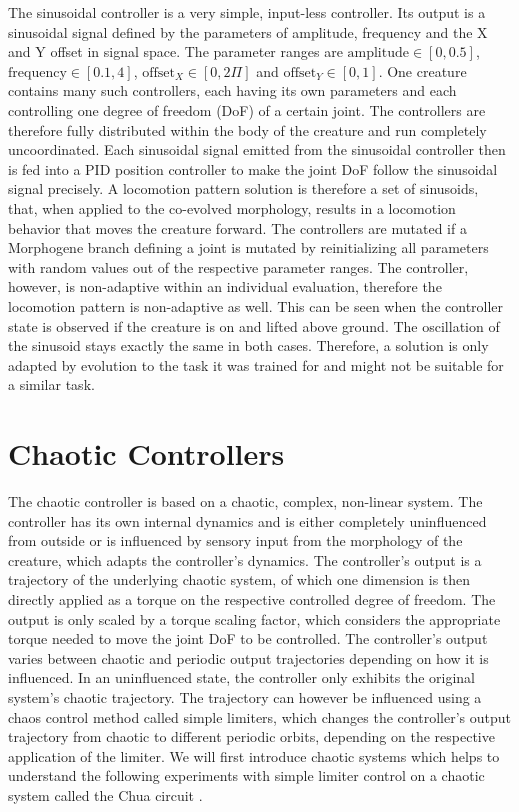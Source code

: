 \documentclass[main]{subfiles}
\begin{document}
The sinusoidal controller is a very simple, input-less controller. %
%
Its output is a sinusoidal signal defined by the parameters of amplitude, frequency and the X and Y offset in signal space. %
%
The parameter ranges are $\text{amplitude} \in [0,0.5]$, $\text{frequency} \in [0.1,4]$, $\text{offset}_X \in [0,2\Pi]$ and $\text{offset}_Y \in [0,1]$. %
%
One creature contains many such controllers, each having its own parameters and each controlling one degree of freedom (DoF) of a certain joint. %
%
The controllers are therefore fully distributed within the body of the creature and run completely uncoordinated. %
%
Each sinusoidal signal emitted from the sinusoidal controller then is fed into a PID position controller to make the joint DoF follow the sinusoidal signal precisely. %
%
A locomotion pattern solution is therefore a set of sinusoids, that, when applied to the co-evolved morphology, results in a locomotion behavior that moves the creature forward. %
%
The controllers are mutated if a Morphogene branch defining a joint is mutated by reinitializing all parameters with random values out of the respective parameter ranges. %
%
The controller, however, is non-adaptive within an individual evaluation, therefore the locomotion pattern is non-adaptive as well. %
%
This can be seen when the controller state is observed if the creature is on and lifted above ground. %
%
The oscillation of the sinusoid stays exactly the same in both cases. %
%
Therefore, a solution is only adapted by evolution to the task it was trained for and might not be suitable for a similar task.

\section{Chaotic Controllers}
\label{sec:chaotic-controllers}

The chaotic controller is based on a chaotic, complex, non-linear system. %
%
The controller has its own internal dynamics and is either completely uninfluenced from outside or is influenced by sensory input from the morphology of the creature, which adapts the controller's dynamics. %
%
The controller's output is a trajectory of the underlying chaotic system, of which one dimension is then directly applied as a torque on the respective controlled degree of freedom. %
%
The output is only scaled by a torque scaling factor, which considers the appropriate torque needed to move the joint DoF to be controlled. %
%
The controller's output varies between chaotic and periodic output trajectories depending on how it is influenced. %
%
In an uninfluenced state, the controller only exhibits the original system's chaotic trajectory. %
%
The trajectory can however be influenced using a chaos control method called simple limiters, which changes the controller's output trajectory from chaotic to different periodic orbits, depending on the respective application of the limiter. %
%
We will first introduce chaotic systems which helps to understand the following experiments with simple limiter control on a chaotic system called the Chua circuit \cite{bib:Matsumoto1985}.
\end{document}
